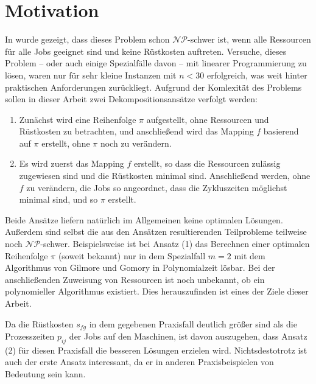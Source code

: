 \documentclass{article}
\begin{document}
\section{Motivation}
In \cite{...} wurde gezeigt, dass dieses Problem schon $\mathcal{NP}$-schwer ist, wenn alle Ressourcen für alle Jobs geeignet sind
und keine Rüstkosten auftreten.
Versuche, dieses Problem -- oder auch einige Spezialfälle davon -- mit linearer Programmierung zu lösen, waren nur für sehr kleine Instanzen mit
$n<30$ erfolgreich, was weit hinter praktischen Anforderungen zurückliegt. Aufgrund der Komlexität des Problems sollen in dieser Arbeit
zwei Dekompositionsansätze verfolgt werden:
\begin{enumerate}
    \item Zunächst wird eine Reihenfolge $\pi$ aufgestellt, ohne Ressourcen und Rüstkosten zu betrachten, 
        und anschließend wird das Mapping $f$ basierend auf $\pi$ erstellt, ohne $\pi$ noch zu verändern.
    \item Es wird zuerst das Mapping $f$ erstellt, so dass die Ressourcen zulässig zugewiesen sind und die Rüstkosten minimal sind.
        Anschließend werden, ohne $f$ zu verändern, die Jobs so angeordnet, dass die Zykluszeiten möglichst minimal sind, und so $\pi$ erstellt.
\end{enumerate}%
Beide Ansätze liefern natürlich im Allgemeinen keine optimalen Lösungen. 
Außerdem sind selbst die aus den Ansätzen resultierenden Teilprobleme teilweise noch $\mathcal{NP}$-schwer.
Beispielsweise ist bei Ansatz (1) das Berechnen einer optimalen Reihenfolge $\pi$ (soweit bekannt) nur in dem Spezialfall $m=2$ 
mit dem Algorithmus von Gilmore und Gomory \cite{...} in Polynomialzeit lösbar.
Bei der anschließenden Zuweisung von Ressourcen ist noch unbekannt, ob ein polynomieller Algorithmus existiert.
Dies herauszufinden ist eines der Ziele dieser Arbeit.

Da die Rüstkosten $s_{fg}$ in dem gegebenen Praxisfall deutlich größer sind als die Prozesszeiten $p_{ij}$ der Jobs auf den Maschinen,
ist davon auszugehen, dass Ansatz (2) für diesen Praxisfall die besseren Lösungen erzielen wird.
Nichtsdestotrotz ist auch der erste Ansatz interessant, da er in anderen Praxisbeispielen von Bedeutung sein kann.
\end{document}

